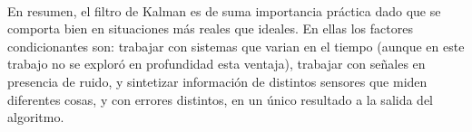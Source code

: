 	\paragraph{}
	En resumen, el filtro de Kalman es de suma importancia práctica dado que se comporta bien en situaciones más reales que ideales. En ellas los factores condicionantes son: trabajar con sistemas que varian en el tiempo (aunque en este trabajo no se exploró en profundidad esta ventaja), trabajar con señales en presencia de ruido, y sintetizar información de distintos sensores que miden diferentes cosas, y con errores distintos, en un único resultado a la salida del algoritmo.
